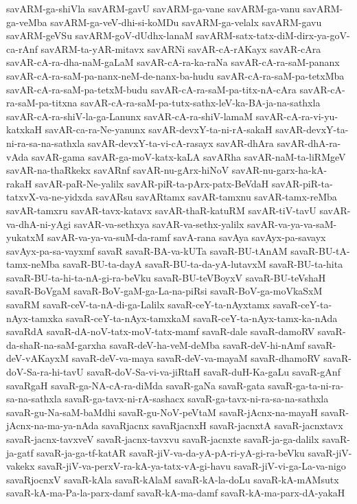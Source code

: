 {savARM-ga-shiVla
savARM-gavU
savARM-ga-vane
savARM-ga-vanu
savARM-ga-veMba
savARM-ga-veV-dhi-si-koMDu
savARM-ga-velalx
savARM-gavu
savARM-geVSu
savARM-goV-dUdhx-lanaM
savARM-satx-tatx-diM-dirx-ya-goV-ca-rAnf
savARM-ta-yAR-mitavx
savARNi
savAR-cA-rAKayx
savAR-cAra
savAR-cA-ra-dha-naM-gaLaM
savAR-cA-ra-ka-raNa
savAR-cA-ra-saM-pananx
savAR-cA-ra-saM-pa-nanx-neM-de-nanx-ba-hudu
savAR-cA-ra-saM-pa-tetxMba
savAR-cA-ra-saM-pa-tetxM-budu
savAR-cA-ra-saM-pa-titx-nA-cAra
savAR-cA-ra-saM-pa-titxna
savAR-cA-ra-saM-pa-tutx-sathx-leV-ka-BA-ja-na-sathxla
savAR-cA-ra-shiV-la-ga-Lanunx
savAR-cA-ra-shiV-lamaM
savAR-cA-ra-vi-yu-katxkaH
savAR-ca-ra-Ne-yanunx
savAR-devxY-ta-ni-rA-sakaH
savAR-devxY-ta-ni-ra-sa-na-sathxla
savAR-devxY-ta-vi-cA-rasayx
savAR-dhAra
savAR-dhA-ra-vAda
savAR-gama
savAR-ga-moV-katx-kaLA
savARha
savAR-naM-ta-liRMgeV
savAR-na-thaRkekx
savARnf
savAR-nu-gArx-hiNoV
savAR-nu-garx-ha-kA-rakaH
savAR-paR-Ne-yalilx
savAR-piR-ta-pArx-patx-BeVdaH
savAR-piR-ta-tatxvX-va-ne-yidxda
savARsu
savARtamx
savAR-tamxnu
savAR-tamx-reMba
savAR-tamxru
savAR-tavx-katavx
savAR-thaR-katuRM
savAR-tiV-tavU
savAR-va-dhA-ni-yAgi
savAR-va-sethxya
savAR-va-sethx-yalilx
savAR-va-ya-va-saM-yukatxM
savAR-va-ya-va-suM-da-ramf
savA-rana
savAya
savAyx-pa-savayx
savAyx-pa-sa-vayxmf
savaR
savaR-BA-va-kUTa
savaR-BU-tAnAM
savaR-BU-tA-tamx-neMba
savaR-BU-ta-dayA
savaR-BU-ta-da-yA-lutavxM
savaR-BU-ta-hita
savaR-BU-ta-hi-ta-nA-gi-ra-beVku
savaR-BU-teVBoyxV
savaR-BU-teVshaH
savaR-BoVgaM
savaR-BoV-gaM-ga-La-na-piRsi
savaR-BoV-ga-moVkaSxM
savaRM
savaR-ceV-ta-nA-di-ga-Lalilx
savaR-ceY-ta-nAyxtamx
savaR-ceY-ta-nAyx-tamxka
savaR-ceY-ta-nAyx-tamxkaM
savaR-ceY-ta-nAyx-tamx-ka-nAda
savaRdA
savaR-dA-noV-tatx-moV-tatx-mamf
savaR-dale
savaR-damoRV
savaR-da-shaR-na-saM-garxha
savaR-deV-ha-veM-deMba
savaR-deV-hi-nAmf
savaR-deV-vAKayxM
savaR-deV-va-maya
savaR-deV-va-mayaM
savaR-dhamoRV
savaR-doV-Sa-ra-hi-tavU
savaR-doV-Sa-vi-va-jiRtaH
savaR-duH-Ka-gaLu
savaR-gAnf
savaRgaH
savaR-ga-NA-cA-ra-diMda
savaR-gaNa
savaR-gata
savaR-ga-ta-ni-ra-sa-na-sathxla
savaR-ga-tavx-ni-rA-sashacx
savaR-ga-tavx-ni-ra-sa-na-sathxla
savaR-gu-Na-saM-baMdhi
savaR-gu-NoV-peVtaM
savaR-jAcnx-na-mayaH
savaR-jAcnx-na-ma-ya-nAda
savaRjacnx
savaRjacnxH
savaR-jacnxtA
savaR-jacnxtavx
savaR-jacnx-tavxveV
savaR-jacnx-tavxvu
savaR-jacnxte
savaR-ja-ga-dalilx
savaR-ja-gatf
savaR-ja-ga-tf-katAR
savaR-jiV-va-da-yA-pA-ri-yA-gi-ra-beVku
savaR-jiV-vakekx
savaR-jiV-va-perxV-ra-kA-ya-tatx-vA-gi-havu
savaR-jiV-vi-ga-La-va-nigo
savaRjocnxV
savaR-kAla
savaR-kAlaM
savaR-kA-la-doLu
savaR-kA-mAMsutx
savaR-kA-ma-Pa-la-parx-damf
savaR-kA-ma-damf
savaR-kA-ma-parx-dA-yakaH
}
